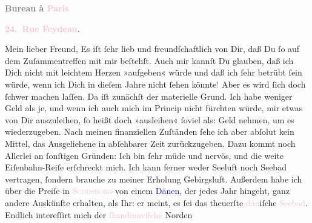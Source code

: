            \pstart
           \begin{otherlanguage}{french}\textcolor{gray}{\textbf{\textbf{Bureau à \textcolor{pink}{Paris}{}\ledrightnote{\textcolor{pink}{Paris}}}}}\end{otherlanguage}\pend
           \pstart
           \begin{otherlanguage}{french}\textcolor{gray}{\textbf{\textbf{\textcolor{pink}{24. Rue Feydeau}{}\ledrightnote{\textcolor{pink}{rue Feydeau}}.}}}\end{otherlanguage}\pend
           \pstart{}Mein lieber Freund,\pend\pstart
           Es iſt ſehr lieb und freundſchaftlich von Dir, daß Du ſo auf dem Zuſammentreffen mit
               mir beſtehſt. Auch mir kannſt Du glauben, daß ich Dich nicht mit leichtem Herzen
               »aufgeben« würde und daß ich ſehr betrübt ſein würde, wenn ich Dich in dieſem Jahre
               nicht ſehen könnte\textcolor{gray}{!} Aber es wird ſich doch ſchwer machen laſſen.
               Da iſt zunächſt der materielle Grund. Ich habe weniger Geld als je, {\pb}und wenn ich auch mich im Princip nicht  fürchten würde, mir etwas von Dir auszuleihen, ſo
               heißt doch »ausleihen« ſoviel\strikeout{,} als: Geld nehmen, um
               es wiederzugeben. Nach meinen \label{T_L02778-1v}\label{T_L02778-1h} finanziellen Zuſtänden ſehe ich aber abſolut
               kein Mittel, \strikeout{\textcolor{gray}{d}} das Ausgeliehene in abſehbarer Zeit zurückzugeben. Dazu kommt noch Allerlei an
               ſonſtigen Gründen: Ich bin ſehr müde und nervös, und die weite Eiſenbahn-Reiſe
               erſchreckt mich. {\pb}Ich kann ferner weder Seeluft noch
                   Seebad vertragen, ſondern brauche zu meiner Erholung Gebirgsluft. Außerdem
               habe ich über die Preiſe in \textsc{\textcolor{pink}{Scodsborg}{}\ledrightnote{\textcolor{pink}{Skodsborg}}} von einem \textcolor{blue}{Dänen}{}, der
               jedes Jahr hingeht, ganz andere Auskünfte erhalten, als Ihr: er meint, es ſei das
               theuerſte \textcolor{pink}{dän}{}iſche \textcolor{pink}{Seebad}{}\ledrightnote{\textcolor{pink}{Skodsborg}}. Endlich  intereſſirt mich der \textcolor{pink}{ſkandinaviſche}{}\ledrightnote{\textcolor{pink}{Skandinavien}} Norden
